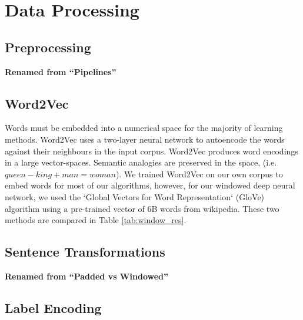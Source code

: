 \section{Data Processing}
\label{sec:data_processing}

  \subsection{Preprocessing}
  \label{sec:preprocessing}
    \textbf{Renamed from ``Pipelines''}

  \subsection{Word2Vec}
  \label{sec:word2vec}
  Words must be embedded into a numerical space for the majority of learning methods. Word2Vec uses a two-layer neural network to autoencode the words against their neighbours in the input corpus. Word2Vec produces word encodings in a large vector-spaces. Semantic analogies are preserved in the space, (i.e. $queen - king + man = woman$). We trained Word2Vec on our own corpus to embed words for most of our algorithms, however, for our windowed deep neural network, we used the `Global Vectors for Word Representation` (GloVe) algorithm using a pre-trained vector of 6B words from wikipedia. These two methods are compared in Table \ref{tab:window_res}.

  \subsection{Sentence Transformations}
  \label{sec:sentence_transformations}
    \textbf{Renamed from ``Padded vs Windowed''}

  \subsection{Label Encoding}
  \label{sec:label_encoding}
